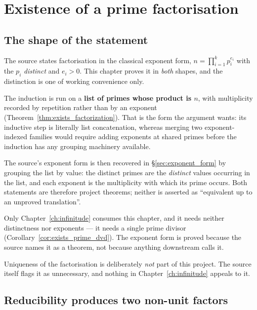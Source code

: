 \chapter{Existence of a prime factorisation}
\label{ch:factorization}

\section{The shape of the statement}

The source states factorisation in the classical exponent form,
$n = \prod_{i=1}^{k} p_i^{e_i}$ with the $p_i$ \emph{distinct} and $e_i > 0$.
This chapter proves it in \emph{both} shapes, and the distinction is one of
working convenience only.

The induction is run on a \textbf{list of primes whose product is $n$}, with
multiplicity recorded by repetition rather than by an exponent
(Theorem~\ref{thm:exists_factorization}). That is the form the argument wants:
its inductive step is literally list concatenation, whereas merging two
exponent-indexed families would require adding exponents at shared primes before
the induction has any grouping machinery available.

The source's exponent form is then recovered in \S\ref{sec:exponent_form} by
grouping the list by value: the distinct primes are the \emph{distinct} values
occurring in the list, and each exponent is the multiplicity with which its prime
occurs. Both statements are therefore project theorems; neither is asserted as
``equivalent up to an unproved translation''.

Only Chapter~\ref{ch:infinitude} consumes this chapter, and it needs neither
distinctness nor exponents --- it needs a single prime divisor
(Corollary~\ref{cor:exists_prime_dvd}). The exponent form is proved because the
source names it as a theorem, not because anything downstream calls it.

Uniqueness of the factorisation is deliberately \emph{not} part of this project.
The source itself flags it as unnecessary, and nothing in
Chapter~\ref{ch:infinitude} appeals to it.

\section{Reducibility produces two non-unit factors}

